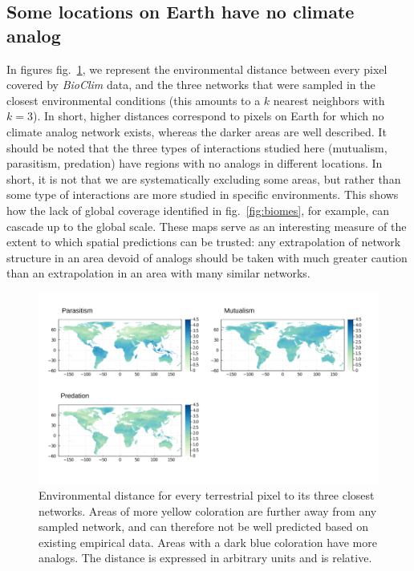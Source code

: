 \documentclass[11pt]{article}
\makeatletter
\def\maxwidth{\ifdim\Gin@nat@width>\linewidth\linewidth
\else\Gin@nat@width\fi}
\let\Oldincludegraphics\includegraphics
\renewcommand{\includegraphics}[1]{\Oldincludegraphics[width=\maxwidth]{#1}}
\makeatother
\begin{document}
\hypertarget{some-locations-on-earth-have-no-climate-analog}{%
\subsection{Some locations on Earth have no climate
analog}\label{some-locations-on-earth-have-no-climate-analog}}

In figures fig.~\ref{fig:envspace}, we represent the environmental
distance between every pixel covered by \emph{BioClim} data, and the
three networks that were sampled in the closest environmental conditions
(this amounts to a \(k\) nearest neighbors with \(k = 3\)). In short,
higher distances correspond to pixels on Earth for which no climate
analog network exists, whereas the darker areas are well described. It
should be noted that the three types of interactions studied here
(mutualism, parasitism, predation) have regions with no analogs in
different locations. In short, it is not that we are systematically
excluding some areas, but rather than some type of interactions are more
studied in specific environments. This shows how the lack of global
coverage identified in fig.~\ref{fig:biomes}, for example, can cascade
up to the global scale. These maps serve as an interesting measure of
the extent to which spatial predictions can be trusted: any
extrapolation of network structure in an area devoid of analogs should
be taken with much greater caution than an extrapolation in an area with
many similar networks.

\begin{figure}
\hypertarget{fig:envspace}{%
\centering
\includegraphics{figures/combined_envirodist_maps.png}
\caption{Environmental distance for every terrestrial pixel to its three
closest networks. Areas of more yellow coloration are further away from
any sampled network, and can therefore not be well predicted based on
existing empirical data. Areas with a dark blue coloration have more
analogs. The distance is expressed in arbitrary units and is
relative.}\label{fig:envspace}
}
\end{figure}
\end{document}
